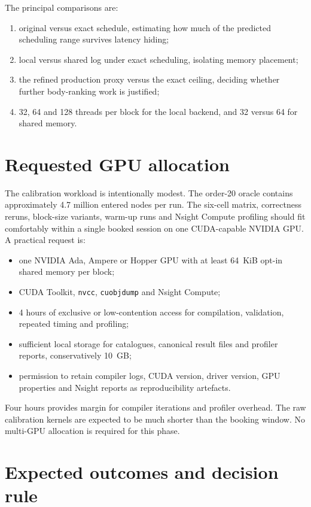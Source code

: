 \documentclass[11pt,a4paper]{article}
\begin{document}
The principal comparisons are:

\begin{enumerate}
  \item original versus exact schedule, estimating how much of the predicted scheduling range survives latency hiding;
  \item local versus shared log under exact scheduling, isolating memory placement;
  \item the refined production proxy versus the exact ceiling, deciding whether further body-ranking work is justified;
  \item 32, 64 and 128 threads per block for the local backend, and 32 versus 64 for shared memory.
\end{enumerate}

\section{Requested GPU allocation}

The calibration workload is intentionally modest. The order-20 oracle contains approximately 4.7 million entered nodes per run. The six-cell matrix, correctness reruns, block-size variants, warm-up runs and Nsight Compute profiling should fit comfortably within a single booked session on one CUDA-capable NVIDIA GPU. A practical request is:

\begin{itemize}
  \item one NVIDIA Ada, Ampere or Hopper GPU with at least 64~KiB opt-in shared memory per block;
  \item CUDA Toolkit, \texttt{nvcc}, \texttt{cuobjdump} and Nsight Compute;
  \item 4 hours of exclusive or low-contention access for compilation, validation, repeated timing and profiling;
  \item sufficient local storage for catalogues, canonical result files and profiler reports, conservatively 10~GB;
  \item permission to retain compiler logs, CUDA version, driver version, GPU properties and Nsight reports as reproducibility artefacts.
\end{itemize}

Four hours provides margin for compiler iterations and profiler overhead. The raw calibration kernels are expected to be much shorter than the booking window. No multi-GPU allocation is required for this phase.

\section{Expected outcomes and decision rule}
\end{document}
